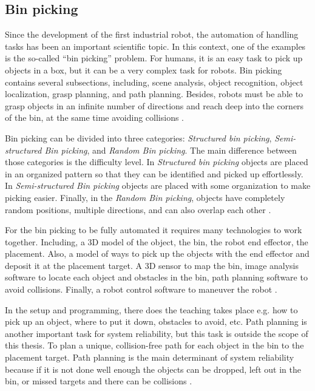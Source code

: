 

\subsection{Bin picking}\label{sec:binpicking}
Since the development of the first industrial robot, the automation of handling tasks has been an important scientific topic. In this context, one of the examples is the so-called “bin picking” problem\cite{buchholz_bin-picking_2015}. 
For humans, it is an easy task to pick up objects in a box, but it can be a very complex task for robots. 
Bin picking contains several subsections, including, scene analysis, object recognition, object localization, grasp planning, and path planning. 
Besides, robots must be able to grasp objects in an infinite number of directions and reach deep into the corners of the bin, at the same time avoiding collisions \cite{truebenbach_is_2019}.

Bin picking can be divided into three categories: \textit{Structured bin picking}, \textit{Semi-structured Bin picking}, and \textit{Random Bin picking}. The main difference between those categories is the difficulty level. In \textit{Structured bin picking} objects are placed in an organized pattern so that they can be identified and picked up effortlessly. In \textit{Semi-structured Bin picking} objects are placed with some organization to make picking easier. Finally, in the \textit{Random Bin picking}, objects have completely random positions, multiple directions, and can also overlap each other \cite{noauthor_robotworx_nodate}.

For the bin picking to be fully automated it requires many technologies to work together. Including, a 3D model of the object, the bin, the robot end effector, the placement. Also, a model of ways to pick up the objects with the end effector and deposit it at the placement target. A 3D sensor to map the bin, image analysis software to locate each object and obstacles in the bin, path planning software to avoid collisions. Finally, a robot control software to maneuver the robot \cite{truebenbach_is_2019}.


In the setup and programming, there does the teaching takes place e.g. how to pick up an object, where to put it down, obstacles to avoid, etc. Path planning is another important task for system reliability, but this task is outside the scope of this thesis. 
To plan a unique, collision-free path for each object in the bin to the placement target. Path planning is the main determinant of system reliability because if it is not done well enough the objects can be dropped, left out in the bin, or missed targets and there can be collisions \cite{zeng_robotic_2019}.




